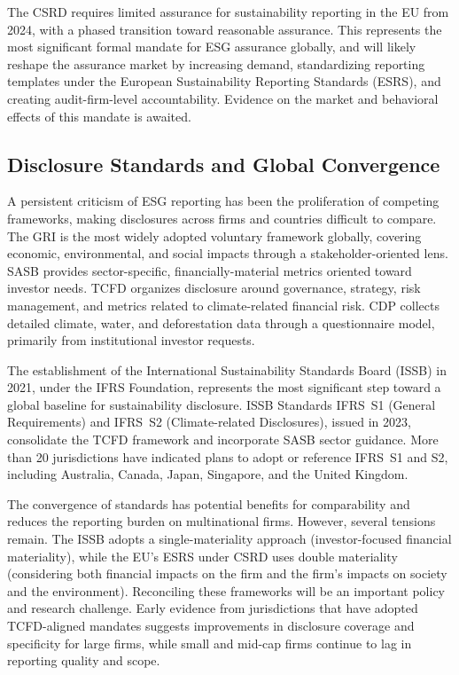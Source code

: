 The CSRD requires limited assurance for sustainability reporting in the EU from
2024, with a phased transition toward reasonable assurance. This represents the
most significant formal mandate for ESG assurance globally, and will likely
reshape the assurance market by increasing demand, standardizing reporting
templates under the European Sustainability Reporting Standards (ESRS), and
creating audit-firm-level accountability. Evidence on the market and behavioral
effects of this mandate is awaited.

\subsection{Disclosure Standards and Global Convergence}
\label{subsec:standards}

A persistent criticism of ESG reporting has been the proliferation of competing
frameworks, making disclosures across firms and countries difficult to compare.
The GRI is the most widely adopted voluntary framework globally, covering
economic, environmental, and social impacts through a stakeholder-oriented
lens. SASB provides sector-specific, financially-material metrics oriented
toward investor needs. TCFD organizes disclosure around governance, strategy,
risk management, and metrics related to climate-related financial risk. CDP
collects detailed climate, water, and deforestation data through a questionnaire
model, primarily from institutional investor requests.

The establishment of the International Sustainability Standards Board (ISSB) in
2021, under the IFRS Foundation, represents the most significant step toward a
global baseline for sustainability disclosure. ISSB Standards IFRS~S1
(General Requirements) and IFRS~S2 (Climate-related Disclosures), issued in
2023, consolidate the TCFD framework and incorporate SASB sector guidance. More
than 20 jurisdictions have indicated plans to adopt or reference IFRS~S1 and
S2, including Australia, Canada, Japan, Singapore, and the United Kingdom.

The convergence of standards has potential benefits for comparability and
reduces the reporting burden on multinational firms. However, several tensions
remain. The ISSB adopts a single-materiality approach (investor-focused
financial materiality), while the EU's ESRS under CSRD uses double materiality
(considering both financial impacts on the firm and the firm's impacts on
society and the environment). Reconciling these frameworks will be an important
policy and research challenge. Early evidence from jurisdictions that have
adopted TCFD-aligned mandates suggests improvements in disclosure coverage and
specificity for large firms, while small and mid-cap firms continue to lag in
reporting quality and scope.

